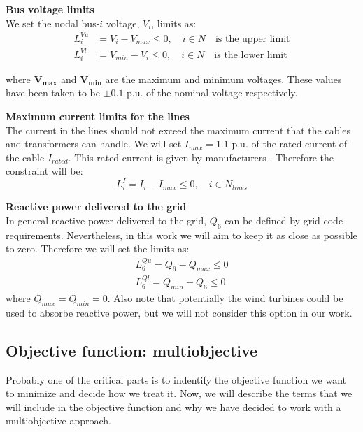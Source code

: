 \documentclass[a4paper,11pt, titlepage, twoside]{article}
\begin{document}
\textbf{Bus voltage limits}\\
We set the nodal bus-$i$ voltage, $V_i$, limits as:
\begin{equation}
\begin{aligned}
    L_{i}^{Vu} &= V_i - V_{max} \leq 0, \quad i \in N \quad \text{is the upper limit} \\
    L_{i}^{Vl} &= V_{min} - V_i \leq 0, \quad i \in N \quad \text{is the lower limit}   
\end{aligned}    
\end{equation}

where $\mathbf{V_{max}}$ and $\mathbf{V_{min}}$ are the maximum and minimum voltages. These values have been taken to be $\pm 0.1$ p.u. of the nominal voltage respectively.

\textbf{Maximum current limits for the lines}\\
The current in the lines should not exceed the maximum current that the cables and transformers can handle. We will set $I_{max} = 1.1$ p.u. of the rated current of the cable $I_{rated}$. This rated current is given by manufacturers \cite{ABB}.
Therefore the constraint will be:
\begin{equation}
    L_{i}^{I} = I_i - I_{max} \leq 0, \quad i \in N_{lines}
\end{equation}

\textbf{Reactive power delivered to the grid}\\
In general reactive power delivered to the grid, $Q_6$ can be defined by grid code requirements. Nevertheless, in this work we will aim to keep it as close as
possible to zero. Therefore we will set the limits as:
\begin{equation}
\begin{aligned}
    L_{6}^{Qu} = Q_6 - Q_{max} \leq 0 \\
    L_{6}^{Ql} = Q_{min} - Q_{6} \leq 0
\end{aligned}
\end{equation}
where $Q_{max}=Q_{min}=0$. Also note that potentially the wind turbines could be used to absorbe reactive power, but we will not consider this option in our work.


\subsection{Objective function: multiobjective}\label{objfun}

Probably one of the critical parts is to indentify the objective function we want to minimize and decide how we treat it. Now, we will describe the terms that we will include in the objective function
and why we have decided to work with a multiobjective approach.\par
\end{document}
